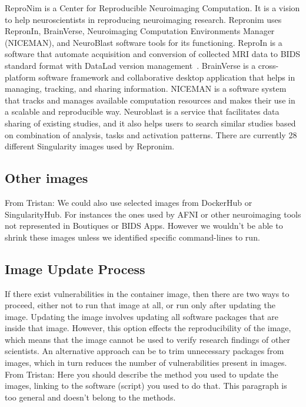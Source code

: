 \documentclass[a4paper,num-refs]{oup-contemporary}
\newcommand{\TG}[1]{\color{blue}From Tristan: #1 \color{black}}
\begin{document}
ReproNim is a Center for Reproducible Neuroimaging Computation. It is a vision
to help neuroscientists in reproducing neuroimaging research. Repronim
uses RepronIn, BrainVerse, Neuroimaging Computation Environments Manager (NICEMAN),
and NeuroBlast software tools for its
functioning. ReproIn is a software that automate acquisition and conversion
of collected MRI data to BIDS standard format with DataLad version management~\cite{kennedy2019everything}.
BrainVerse is a cross-platform software framework and collaborative desktop application
that helps in managing, tracking, and sharing information.
NICEMAN is a software system that tracks and manages available computation resources
and makes their use in a scalable and reproducible way.
Neuroblast is a service that facilitates data sharing of existing studies, and it also
helps users to search similar studies based on combination of analysis,
tasks and activation patterns. There are currently 28 different Singularity
images used by Repronim. 

\subsection{Other images}

\TG{We could also use selected images from DockerHub or SingularityHub. For
instances the ones used by AFNI or other neuroimaging tools not represented
in Boutiques or BIDS Apps. However we wouldn't be able to shrink these
images unless we identified specific command-lines to run.}

\subsection{Image Update Process}

If there exist vulnerabilities in the container image, then there are two ways
to proceed, either not to run that image at all, or run only after updating the
image. Updating the image involves updating all software packages that are
inside that image. However, this option effects the reproducibility
of the image, which means that the image cannot be used to verify research
findings of other scientists. An alternative approach can be to trim unnecessary
packages from images, which in turn reduces the number of vulnerabilities
present in images. \TG{Here you should describe the method you used to update the images, linking to the 
software (script) you used to do that. 
This paragraph is too general and doesn't belong to the methods. }
\end{document}
